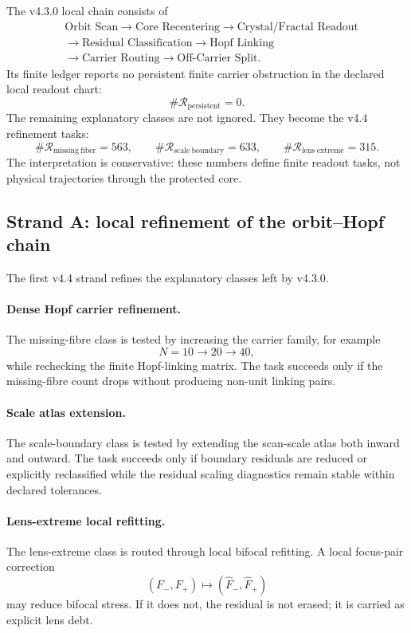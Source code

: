 The v4.3.0 local chain consists of
\[
\begin{aligned}
&\text{Orbit Scan}
\to \text{Core Recentering}
\to \text{Crystal/Fractal Readout}\\
{}&\to \text{Residual Classification}
\to \text{Hopf Linking}\\
{}&\to \text{Carrier Routing}
\to \text{Off-Carrier Split}.
\end{aligned}
\]
Its finite ledger reports no persistent finite carrier obstruction in the
declared local readout chart:
\[
    \#\mathcal R_{\mathrm{persistent}}=0.
\]
The remaining explanatory classes are not ignored.  They become the v4.4
refinement tasks:
\[
    \#\mathcal R_{\mathrm{missing\ fiber}}=563,
    \qquad
    \#\mathcal R_{\mathrm{scale\ boundary}}=633,
    \qquad
    \#\mathcal R_{\mathrm{lens\ extreme}}=315.
\]
The interpretation is conservative: these numbers define finite readout tasks,
not physical trajectories through the protected core.

\subsection{Strand A: local refinement of the orbit--Hopf chain}
\label{subsec:v44-strand-a-refinement}

The first v4.4 strand refines the explanatory classes left by v4.3.0.

\paragraph{Dense Hopf carrier refinement.}
The missing-fibre class is tested by increasing the carrier family,
for example
\[
    N=10\longrightarrow 20\longrightarrow 40,
\]
while rechecking the finite Hopf-linking matrix.  The task succeeds only if the
missing-fibre count drops without producing non-unit linking pairs.

\paragraph{Scale atlas extension.}
The scale-boundary class is tested by extending the scan-scale atlas both
inward and outward.  The task succeeds only if boundary residuals are reduced
or explicitly reclassified while the residual scaling diagnostics remain
stable within declared tolerances.

\paragraph{Lens-extreme local refitting.}
The lens-extreme class is routed through local bifocal refitting.  A local
focus-pair correction
\[
    (F_-,F_+)
    \longmapsto
    (\widehat F_-,\widehat F_+)
\]
may reduce bifocal stress.  If it does not, the residual is not erased; it is
carried as explicit lens debt.

